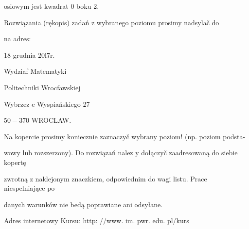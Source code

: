 \documentclass[a4paper,12pt]{article}
\begin{document}
osiowym jest kwadrat $0$ boku 2.

Rozwiązania (rękopis) zadań z wybranego poziomu prosimy nadsylač do

na adres:

18 grudnia 20l7r.

Wydziaf Matematyki

Politechniki Wrocfawskiej

Wybrzez $\mathrm{e}$ Wyspiańskiego 27

$50-370$ WROCLAW.

Na kopercie prosimy $\underline{\mathrm{k}\mathrm{o}\mathrm{n}\mathrm{i}\mathrm{e}\mathrm{c}\mathrm{z}\mathrm{n}\mathrm{i}\mathrm{e}}$ zaznaczyč wybrany poziom! (np. poziom podsta-

wowy lub rozszerzony). Do rozwiązań nalez $\mathrm{y}$ dołączyč zaadresowaną do siebie kopertę

zwrotną $\mathrm{z}$ naklejonym znaczkiem, odpowiednim do wagi listu. Prace niespelniające po-

danych warunków nie bedą poprawiane ani odsyłane.

Adres internetowy Kursu: http: //www. im. pwr. edu. pl/kurs
\end{document}
